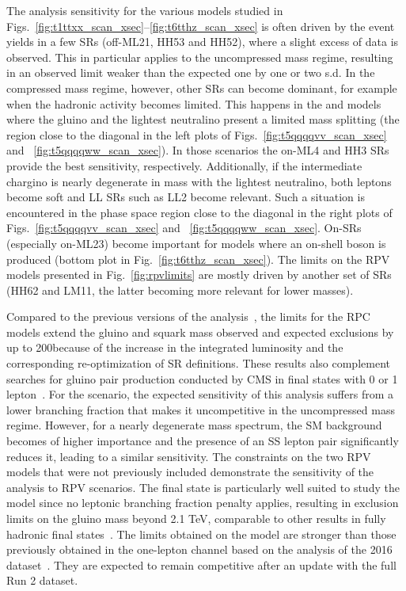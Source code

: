 The analysis sensitivity for the various models studied in Figs.~\ref{fig:t1ttxx_scan_xsec}--\ref{fig:t6tthz_scan_xsec} is often driven by the event yields in a few SRs (off-\PZ ML21, HH53 and HH52), where a slight excess of data is observed.
This in particular applies to the uncompressed mass regime, resulting in an observed limit weaker than the expected one by one or two s.d.
In the compressed mass regime, however, other SRs can become dominant, for example when the hadronic activity becomes limited. 
This happens in the \TfqqqqWZ and \TfqqqqWW models where the gluino and the lightest neutralino present a limited mass splitting (the region close to the diagonal in the left plots of Figs.~\ref{fig:t5qqqqvv_scan_xsec} and ~\ref{fig:t5qqqqww_scan_xsec}). In those scenarios the on-\PZ ML4 and HH3 SRs provide the best sensitivity, respectively. 
Additionally, if the intermediate chargino is nearly degenerate in mass with the lightest neutralino, both leptons become soft and LL SRs such as LL2 become relevant. Such a situation is encountered in the phase space region close to the diagonal in the right plots of Figs.~\ref{fig:t5qqqqvv_scan_xsec} and ~\ref{fig:t5qqqqww_scan_xsec}.
On-\PZ SRs (especially on-\PZ ML23) become important for models where an on-shell \PZ boson is produced (bottom plot in Fig.~\ref{fig:t6tthz_scan_xsec}).
The limits on the RPV models presented in Fig.~\ref{fig:rpvlimits} are mostly driven by another set of SRs (HH62 and LM11, the latter becoming more relevant for lower masses).


Compared to the previous versions of the
analysis~\cite{CMS:mySUS2016,CMS:SUS16041}, the limits for the RPC models
extend the gluino and squark mass observed and expected exclusions by up to
200\GeV because of the increase in the integrated luminosity and the
corresponding re-optimization of SR definitions. These results also
complement searches for gluino pair production conducted by CMS in final
states with 0 or 1
lepton~\cite{CMS:2019tlp,CMS:Sirunyan2019ctn,CMS:Sirunyan2019xwh}. 
For the \Totttt
scenario, the expected sensitivity of this analysis suffers from a lower
branching fraction that makes it uncompetitive in the uncompressed mass
regime. However, for a nearly degenerate mass spectrum, the SM background
becomes of higher importance and the presence of an SS lepton pair
significantly reduces it, leading to a similar sensitivity. The constraints
on the two RPV models that were not previously included demonstrate the
sensitivity of the analysis to RPV scenarios. The final state is particularly
well suited to study the \ToqqqqL model since no leptonic branching fraction
penalty applies, resulting in exclusion limits on the gluino mass beyond 2.1
TeV, comparable to other results in fully hadronic final
states~\cite{CMS:Sirunyan2019ctn,CMS:Sirunyan2019xwh}. The limits obtained on the
\Totbs model are stronger than those previously obtained in the one-lepton
channel based on the analysis of the 2016 dataset~\cite{CMS:Sirunyan2017dhe}.
They are expected to remain competitive after an update with the full Run 2
dataset.


